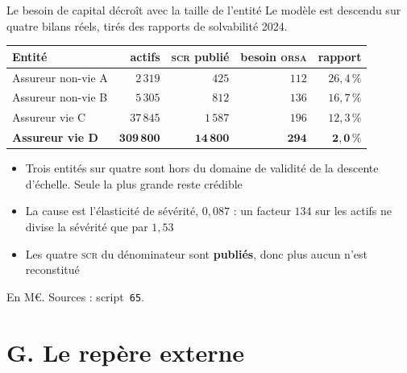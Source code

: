 \documentclass[11pt]{beamer}
\begin{document}
\begin{frame}{Le besoin de capital décroît avec la taille de l'entité}
\small
Le modèle est descendu sur quatre bilans réels, tirés des rapports de solvabilité 2024.
\vspace{1mm}

\begin{center}\small
\begin{tabular}{@{}l r r r r@{}}
\toprule
\textbf{Entité} & \textbf{actifs} & \textbf{\textsc{scr} publié} & \textbf{besoin \textsc{orsa}}
& \textbf{rapport} \\
\midrule
Assureur non-vie A & $2\,319$ & $425$ & $112$ & $26{,}4\,\%$ \\
Assureur non-vie B & $5\,305$ & $812$ & $136$ & $16{,}7\,\%$ \\
Assureur vie C & $37\,845$ & $1\,587$ & $196$ & $12{,}3\,\%$ \\
\textbf{Assureur vie D} & $\mathbf{309\,800}$ & $\mathbf{14\,800}$ & $\mathbf{294}$ &
$\mathbf{2{,}0\,\%}$ \\
\bottomrule
\end{tabular}
\end{center}
\vspace{2mm}

\begin{itemize}\itemsep4pt
  \item \alert{Trois entités sur quatre sont hors du domaine de validité} de la descente
        d'échelle. Seule la plus grande reste crédible
  \item La cause est l'élasticité de sévérité, $0{,}087$ : un facteur $134$ sur les actifs ne
        divise la sévérité que par $1{,}53$
  \item Les quatre \textsc{scr} du dénominateur sont \textbf{publiés}, donc plus aucun n'est
        reconstitué
\end{itemize}
\vspace{1mm}
{\scriptsize En M\euro. Sources : script~\texttt{65}.}
\end{frame}

\section*{G. Le repère externe}
\end{document}
